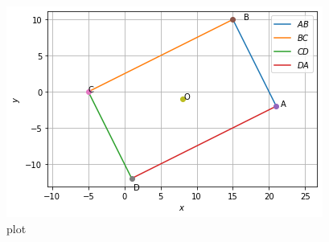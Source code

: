 \documentclass[journal,12pt,twocolumn]{IEEEtran}
\begin{document}
\begin{figure}[htp]
    \centering
    \includegraphics[width=\columnwidth]{1.png}
    \caption{plot}
    \label{fig:my_label}
\end{figure}
\end{document}
